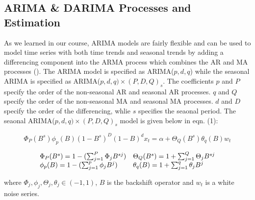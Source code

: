 \documentclass[
]{article}
\begin{document}
\subsection{ARIMA \& DARIMA Processes and Estimation}

As we learned in our course, ARIMA models are fairly flexible and can be used to model time series with both time trends and seasonal trends by adding a differencing component into the ARMA process which combines the AR and MA processes (\cite[p.~99]{shumway_time_2019}). The ARIMA model is specified as ARIMA($p,d,q$) while the seasonal ARIMA is specified as ARIMA($p,d,q) \times (P,D,Q)_s$. The coefficients $p$ and $P$ specify the order of the non-seasonal AR and seasonal AR processes. $q$ and $Q$ specify the order of the non-seasonal MA and seasonal MA processes. $d$ and $D$ specify the order of the differencing, whlie $s$ specifies the seaonal period. The seaonal ARIMA($p,d,q) \times (P,D,Q)_s$ model is given below in eqn. (1):

\begin{equation}
  \Phi_P(B^s)\phi_p(B)(1 - B^s)^D (1 - B)^d x_t = \alpha + \Theta_Q(B^s) \theta_q(B) w_t
\end{equation}

\[
\begin{array}[h]{ll}
  \Phi_P(B^s) = 1 - (\sum_{j = 1}^P \Phi_j B^{sj}) & \Theta_Q(B^s) = 1 + \sum_{j = 1}^Q \Theta_j B^{sj} \\
  \phi_p(B) = 1 - (\sum_{j = 1}^p \phi_j B^j) & \theta_q(B) = 1 + \sum_{j = 1}^q \theta_j B^j
\end{array}
\]

where $\Phi_j, \phi_j, \Theta_j, \theta_j \in (-1,1)$, $B$ is the backshift operator and $w_t$ is a white noise series.
\end{document}
